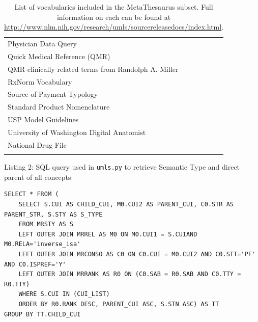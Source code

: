 \documentclass[Report.tex]{subfiles}
\begin{document}
\begin{longtable}{| p{} |}
Physician Data Query\\
Quick Medical Reference (QMR)\\
QMR clinically related terms from Randolph A. Miller\\
RxNorm Vocabulary\\
Source of Payment Typology\\
Standard Product Nomenclature\\
USP Model Guidelines\\
University of Washington Digital Anatomist\\
National Drug File\\ \hline
\caption{List of vocabularies included in the MetaThesaurus subset. Full information on each can be found at \url{http://www.nlm.nih.gov/research/umls/sourcereleasedocs/index.html}.\label{tab:vocabs}}
\end{longtable}
\newpage


\noindent Listing 2: SQL query used in \texttt{umls.py} to retrieve Semantic Type and direct parent of all concepts
\begin{lstlisting}
SELECT * FROM (
	SELECT S.CUI AS CHILD_CUI, M0.CUI2 AS PARENT_CUI, C0.STR AS PARENT_STR, S.STY AS S_TYPE
	FROM MRSTY AS S
	LEFT OUTER JOIN MRREL AS M0 ON M0.CUI1 = S.CUIAND M0.RELA='inverse_isa'
	LEFT OUTER JOIN MRCONSO AS C0 ON C0.CUI = M0.CUI2 AND C0.STT='PF' AND C0.ISPREF='Y'
	LEFT OUTER JOIN MRRANK AS R0 ON (C0.SAB = R0.SAB AND C0.TTY = R0.TTY)
	WHERE S.CUI IN (CUI_LIST)
	ORDER BY R0.RANK DESC, PARENT_CUI ASC, S.STN ASC) AS TT
GROUP BY TT.CHILD_CUI
\end{lstlisting}
\newpage
\end{document}
